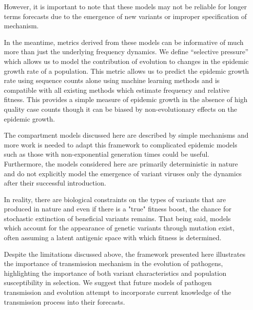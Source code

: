 \documentclass[12pt,oneside,letterpaper]{article}
\begin{document}
However, it is important to note that these models may not be reliable for longer terms forecasts due to the emergence of new variants or improper specification of mechanism.

In the meantime, metrics derived from these models can be informative of much more than just the underlying frequency dynamics.
We define ``selective pressure'' which allows us to model the contribution of evolution to changes in the epidemic growth rate of a population.
This metric allows us to predict the epidemic growth rate using sequence counts alone using machine learning methods and is compatible with all existing methods which estimate frequency and relative fitness.
This provides a simple measure of epidemic growth in the absence of high quality case counts though it can be biased by non-evolutionary effects on the epidemic growth.

% 
%


The compartment models discussed here are described by simple mechanisms and more work is needed to adapt this framework to complicated epidemic models such as those with non-exponential generation times could be useful.
Furthermore, the models considered here are primarily deterministic in nature and do not explicitly model the emergence of variant viruses only the dynamics after their successful introduction.

In reality, there are biological constraints on the types of variants that are produced in nature and even if there is a "true" fitness boost, the chance for stochastic extinction of beneficial variants remains.
That being said, models which account for the appearance of genetic variants through mutation exist, often assuming a latent antigenic space with which fitness is determined.

Despite the limitations discussed above, the framework presented here illustrates the importance of transmission mechanism in the evolution of pathogens, highlighting the importance of both variant characteristics and population susceptibility in selection.
We suggest that future models of pathogen transmission and evolution attempt to incorporate current knowledge of the transmission process into their forecasts.
\end{document}
